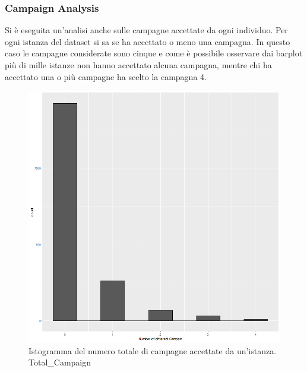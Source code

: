 \documentclass[letterpaper,11pt]{article}
\begin{document}
\newpage

\subsubsection{Campaign Analysis}

Si è eseguita un'analisi anche sulle campagne accettate da ogni individuo. 
Per ogni istanza del dataset si sa se ha accettato o meno una campagna. In questo caso le campagne considerate sono cinque e come è possibile osservare dai barplot più di mille istanze non hanno accettato alcuna campagna, mentre chi ha accettato una o più campagne ha scelto la campagna 4.\\

\begin{figure}[H]
  \centering
  \begin{minipage}[b]{0.4\textwidth}
    \includegraphics[width=\textwidth]{Img/EDA/EDA039.png}
    \caption{Istogramma del numero totale di campagne accettate da un'istanza. Total\_Campaign}
    \label{fig:IstogrammaTotalCampaign1}
  \end{minipage}
  \hfill
  \begin{minipage}[b]{0.4\textwidth}

\end{minipage}
\end{figure}
\end{document}
